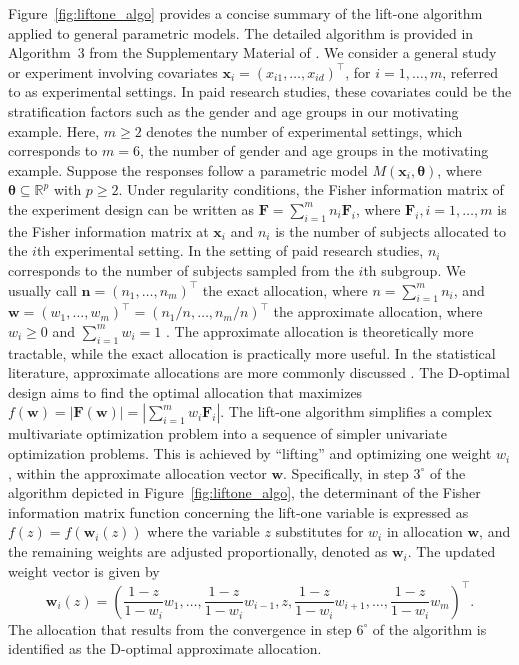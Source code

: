 Figure~\ref{fig:liftone_algo} provides a concise summary of the lift-one algorithm applied to general parametric models. The detailed algorithm is provided in Algorithm~$3$ from the Supplementary Material of \citet{huang2023constrained}. We consider a general study or experiment involving covariates $\mathbf{x}_i = (x_{i1}, \dots, x_{id})^\top$, for $i = 1, \dots, m$, referred to as experimental settings. In paid research studies, these covariates could be the stratification factors such as the gender and age groups in our motivating example. Here, $m \ge 2$ denotes the number of experimental settings, which corresponds to $m=6$, the number of gender and age groups in the motivating example. Suppose the responses follow a parametric model $M(\mathbf x_i, \boldsymbol \theta)$, where $\boldsymbol \theta \subseteq \mathbb{R}^p$ with $p\ge 2$. Under regularity conditions, the Fisher information matrix of the experiment design can be written as $\mathbf F = \sum_{i=1}^m n_i \mathbf F_i$, where $\mathbf F_i, i=1, \dots, m$ is the Fisher information matrix at $\mathbf x_i$ and $n_i$ is the number of subjects allocated to the $i$th experimental setting. In the setting of paid research studies, $n_i$ corresponds to the number of subjects sampled from the $i$th subgroup. We usually call $\mathbf n = (n_1, \dots, n_m)^\top$ the exact allocation, where $n=\sum_{i=1}^m n_i$, and $\mathbf w = (w_1,\dots,w_m)^\top=(n_1/n, \dots, n_m/n)^\top$ the approximate allocation, where $w_i \ge 0$ and $\sum_{i=1}^m w_i = 1$ \citep{kiefer1974, pukelsheim2006optimal, atkinson2007}. The approximate allocation is theoretically more tractable, while the exact allocation is practically more useful. In the statistical literature, approximate allocations are more commonly discussed \citep{kiefer1974}. The D-optimal design aims to find the optimal allocation that maximizes $f({\mathbf w})=|\mathbf F({\mathbf w})|=|\sum_{i=1}^m w_i \mathbf F_i|$. The lift-one algorithm simplifies a complex multivariate optimization problem into a sequence of simpler univariate optimization problems.  This is achieved by ``lifting'' and optimizing one weight $w_i$, within the approximate allocation vector $\mathbf w$. Specifically, in step $3^\circ$ of the algorithm depicted in Figure~\ref{fig:liftone_algo}, the determinant of the Fisher information matrix function concerning the lift-one variable is expressed as $f(z) = f(\mathbf w_i(z))$ where the variable $z$ substitutes for $w_i$ in allocation $\mathbf{w}$, and the remaining weights are adjusted proportionally, denoted as $\mathbf w_i$. The updated weight vector is given by
\[
\mathbf w_i(z) = \left( \frac{1-z}{1-w_i}w_1, \ldots, \frac{1-z}{1-w_i}w_{i-1}, z, \frac{1-z}{1-w_i}w_{i+1}, \ldots, \frac{1-z}{1-w_i}w_m\right)^\top.
\]
The allocation that results from the convergence in step $6^\circ$ of the algorithm is identified as the D-optimal approximate allocation.

